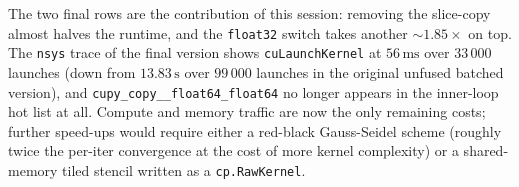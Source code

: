\noindent
The two final rows are the contribution of this session: removing
the slice-copy almost halves the runtime, and the \verb|float32|
switch takes another ${\sim}1.85{\times}$ on top.
The \verb|nsys| trace of the final version shows
\verb|cuLaunchKernel| at $56\,\text{ms}$ over $33\,000$ launches
(down from $13.83\,\text{s}$ over $99\,000$ launches in the original
unfused batched version), and \verb|cupy_copy__float64_float64| no
longer appears in the inner-loop hot list at all. Compute and memory
traffic are now the only remaining costs; further speed-ups would
require either a red-black Gauss-Seidel scheme (roughly twice the
per-iter convergence at the cost of more kernel complexity) or a
shared-memory tiled stencil written as a \verb|cp.RawKernel|.
